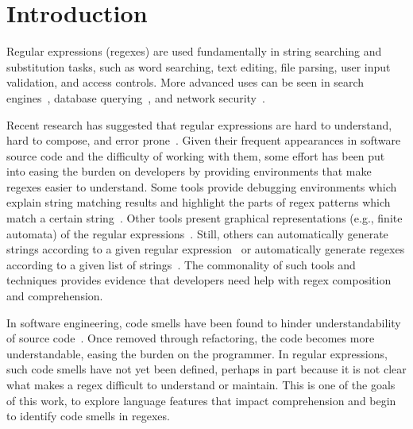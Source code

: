 \section{Introduction }

Regular expressions (regexes) are used fundamentally in string searching and substitution tasks, such as word searching, text editing, file parsing, user input validation, and access controls. More advanced uses can be seen in search engines~\cite{zhao2005fully}, database querying~\cite{Yeole:2011:ADT:1980022.1980229}, and network security~\cite{network,hutchings2002assisting,ficara2008improved}.

Recent research has suggested that regular expressions are hard to understand, hard to compose, and error prone~\cite{Spishak:2012:TSR:2318202.2318207}. Given their frequent appearances in software source code and the difficulty of working with them, some effort has been put into easing the burden on developers by providing environments that make regexes easier to understand. Some tools provide debugging environments which explain string matching results and highlight the parts of regex patterns which match a certain string~\cite{regex101, regexr}. Other tools present graphical representations (e.g., finite automata) of the regular expressions~\cite{regexper, rise4fun}. Still, others can automatically generate strings according to a given regular expression~\cite{hampi, rex} or automatically generate regexes according to a given list of strings~\cite{Babbar:2010:CBA:1871840.1871848, Li:2008:REL:1613715.1613719}.
The commonality of such tools and techniques provides evidence that developers need help with regex composition and comprehension.

In software engineering, code smells have been found to hinder understandability of source code~\cite{abbes2011empirical, du2006does}.
Once removed through refactoring, the code becomes more understandable, easing the burden on the programmer.
In regular expressions, such code smells have not yet been defined, perhaps in part because it is not clear what makes a regex difficult to understand or maintain.
This is one of the goals of this work, to explore language features that impact comprehension and begin to identify code smells in regexes.

